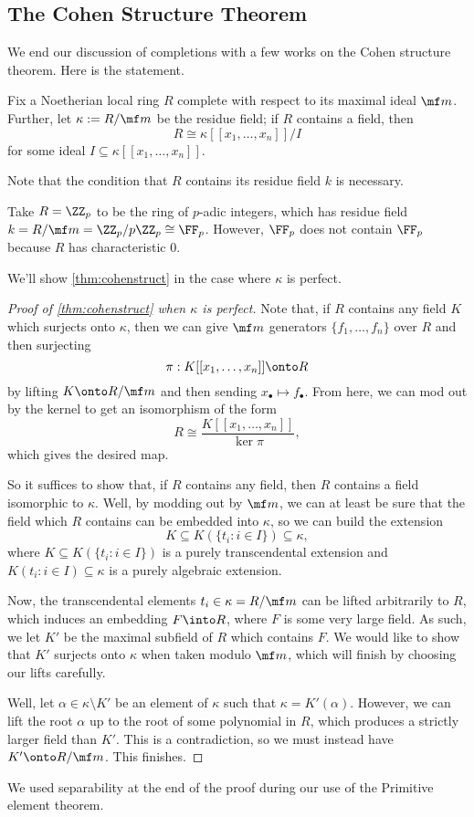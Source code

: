 \subsection{The Cohen Structure Theorem}
We end our discussion of completions with a few works on the Cohen structure theorem. Here is the statement.
\begin{theorem} \label{thm:cohenstruct}
	Fix a Noetherian local ring $R$ complete with respect to its maximal ideal $\mf m$. Further, let $\kappa:=R/\mf m$ be the residue field; if $R$ contains a field, then
	\[R\cong\kappa[[x_1,\ldots,x_n]]/I\]
	for some ideal $I\subseteq\kappa[[x_1,\ldots,x_n]]$.
\end{theorem}
Note that the condition that $R$ contains its residue field $k$ is necessary.
\begin{nex}
	Take $R=\ZZ_p$ to be the ring of $p$-adic integers, which has residue field $k=R/\mf m=\ZZ_p/p\ZZ_p\cong\FF_p$. However, $\FF_p$ does not contain $\FF_p$ because $R$ has characteristic $0$.
\end{nex}
We'll show \autoref{thm:cohenstruct} in the case where $\kappa$ is perfect.
\begin{proof}[Proof of \autoref{thm:cohenstruct} when $\kappa$ is perfect]
	Note that, if $R$ contains any field $K$ which surjects onto $\kappa$, then we can give $\mf m$ generators $\{f_1,\ldots,f_n\}$ over $R$ and then surjecting
	\[\pi:K[[x_1,\ldots,x_n]]\onto R\]
	by lifting $K\onto R/\mf m$ and then sending $x_\bullet\mapsto f_\bullet$. %
	From here, we can mod out by the kernel to get an isomorphism of the form
	\[R\cong\frac{K[[x_1,\ldots,x_n]]}{\ker\pi},\]
	which gives the desired map.

	So it suffices to show that, if $R$ contains any field, then $R$ contains a field isomorphic to $\kappa$. Well, by modding out by $\mf m$, we can at least be sure that the field which $R$ contains can be embedded into $\kappa$, so we can build the extension
	\[K\subseteq K(\{t_i:i\in I\})\subseteq\kappa,\]
	where $K\subseteq K(\{t_i:i\in I\})$ is a purely transcendental extension and $K(t_i:i\in I)\subseteq\kappa$ is a purely algebraic extension.

	Now, the transcendental elements $t_i\in\kappa=R/\mf m$ can be lifted arbitrarily to $R$, which induces an embedding $F\into R$, where $F$ is some very large field. As such, we let $K'$ be the maximal subfield of $R$ which contains $F$. We would like to show that $K'$ surjects onto $\kappa$ when taken modulo $\mf m$, which will finish by choosing our lifts carefully.

	Well, let $\alpha\in\kappa\setminus K'$ be an element of $\kappa$ such that $\kappa=K'(\alpha)$. However, we can lift the root $\alpha$ up to the root of some polynomial in $R$, which produces a strictly larger field than $K'$. This is a contradiction, so we must instead have $K'\onto R/\mf m$. This finishes.
\end{proof}
\begin{remark}
	We used separability at the end of the proof during our use of the Primitive element theorem.
\end{remark}
